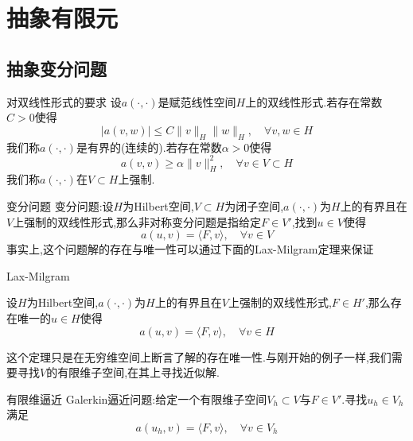 \documentclass{beamer}
\begin{document}
\section{抽象有限元}
\subsection{抽象变分问题}
\begin{frame}{对双线性形式的要求}
\small
设$a(\cdot,\cdot)$是赋范线性空间$H$上的双线性形式.若存在常数$C>0$使得
$$
|a(v,w)|\leqslant C\|v\|_H\|w\|_H,\quad \forall v,w\in H
$$
我们称$a(\cdot,\cdot)$是有界的(连续的).若存在常数$\alpha >0$使得
$$
a(v,v)\geqslant \alpha \|v\|^2_H,\quad \forall v\in V\subset H
$$
我们称$a(\cdot,\cdot)$在$V\subset H$上强制.
\end{frame}

\begin{frame}{变分问题}
变分问题:设$H$为Hilbert空间,$V\subset H$为闭子空间,$a(\cdot,\cdot)$为$H$上的有界且在$V$上强制的双线性形式,那么非对称变分问题是指给定$F\in V'$,找到$u\in V$使得
\begin{equation}
    a(u,v)=\langle F,v\rangle,\quad \forall v\in V
    \label{eq:2.6.2}
\end{equation}
事实上,这个问题解的存在与唯一性可以通过下面的Lax-Milgram定理来保证
\end{frame}

\begin{frame}{Lax-Milgram}
\small
\begin{tcolorbox}[colback=white,colframe=njupt,title=\textbf{Lax-Milgram定理},sharpish corners]
    设$H$为Hilbert空间,$a(\cdot,\cdot)$为$H$上的有界且在$V$上强制的双线性形式,$F\in H'$,那么存在唯一的$u\in H$使得
    $$
    a(u,v)=\langle F,v\rangle,\quad \forall v\in H
    $$
\end{tcolorbox}
这个定理只是在无穷维空间上断言了解的存在唯一性.与刚开始的例子一样,我们需要寻找$V$的有限维子空间,在其上寻找近似解.
\end{frame}

\begin{frame}{有限维逼近}
\small
Galerkin逼近问题:给定一个有限维子空间$V_h\subset V$与$F\in V'$.寻找$u_h\in V_h$满足
\begin{equation}
    a(u_h,v)=\langle F,v\rangle,\quad \forall v\in V_h
    \label{eq:2.6.3}
\end{equation}
\end{frame}
\end{document}
